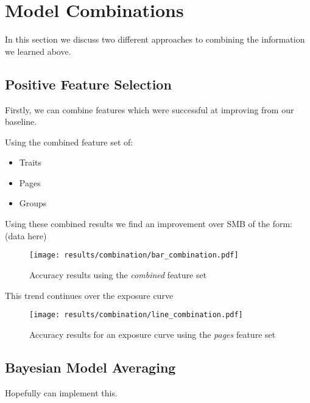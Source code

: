 
\chapter{Model Combinations}
\label{cha:bma}

In this section we discuss two different approaches to combining the information we learned above.

\section{Positive Feature Selection}
\label{sec:notation}

Firstly, we can combine features which were successful at improving from our baseline.

Using the combined feature set of:
\begin{itemize}
\item Traits
\item Pages
\item Groups
\end{itemize}

Using these combined results we find an improvement over SMB of the form:
(data here)

\begin{figure}[h]
	\begin{center}
		\texttt{[image: results/combination/bar\_combination.pdf]}
		\caption{Accuracy results using the \emph{combined} feature set}
	\end{center}
\end{figure}

This trend continues over the exposure curve

\begin{figure}[h]
	\begin{center}
		\texttt{[image: results/combination/line\_combination.pdf]}
		\caption{Accuracy results for an exposure curve using the \emph{pages} feature set}
	\end{center}
\end{figure}


\section{Bayesian Model Averaging}
\label{sec:bma}

Hopefully can implement this.

